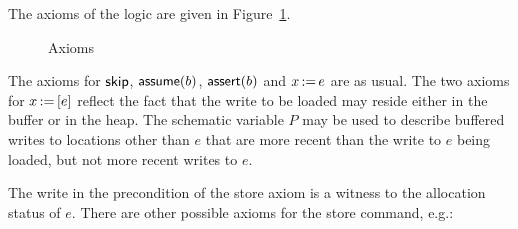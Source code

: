 \documentclass[11pt]{report}
\begin{document}
The axioms of the logic are given in Figure~\ref{fig:axioms}.

\begin{figure}[ht]
	\centering
	\caption{\label{fig:axioms}Axioms}
\end{figure}

The axioms for $\operatorname{\mathsf{skip}}$, $\operatorname{\mathsf{assume}}(b)$, $\operatorname{\mathsf{assert}}(b)$ and $x \operatorname{:\!=} e$ are as usual. The two axioms for $x \operatorname{:\!=} \left[ e \right]$ reflect the fact that the write to be loaded may reside either in the buffer or in the heap. The schematic variable $P$ may be used to describe buffered writes to locations other than $e$ that are more recent than the write to $e$ being loaded, but not more recent writes to $e$. 

The write in the precondition of the store axiom is a witness to the allocation status of $e$. There are other possible axioms for the store command, e.g.: 
\end{document}
